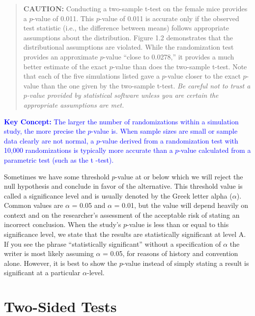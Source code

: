 \documentclass[
]{report}
\begin{document}
\begin{quote}
\textbf{CAUTION:}
Conducting a two-sample t-test on the female mice provides a \(p\)-value of 0.011. This \(p\)-value of 0.011 is accurate only if the observed test statistic (i.e., the difference between means) follows appropriate assumptions about the distribution. Figure 1.2 demonstrates that the distributional assumptions are violated. While the randomization test provides an approximate \(p\)-value ``close to 0.0278,'' it provides a much better estimate of the exact \(p\)-value than does the two-sample t-test. Note that each of the five simulations listed gave a \(p\)-value closer to the exact \(p\)-value than the one given by the two-sample t-test. \textit{Be careful not to trust a $p$-value provided by statistical software unless you are certain the appropriate assumptions are met.}
\end{quote}

\textbf{\textcolor{blue}{Key Concept:}}
\textcolor{blue}{The larger the number of randomizations within a simulation study, the more precise the $p$-value is. When sample sizes are small or sample data clearly are not normal, a $p$-value derived from a randomization test with 10,000 randomizations is typically more accurate than a $p$-value calculated from a parametric test (such as the t -test).}

Sometimes we have some threshold \(p\)-value at or below which we will reject the null hypothesis and conclude in favor of the alternative. This threshold value is called a significance level and is usually denoted by the Greek letter alpha (\(\alpha\)). Common values are \(\alpha\) = 0.05 and \(\alpha\) = 0.01, but the value will depend heavily
on context and on the researcher's assessment of the acceptable risk of stating an incorrect conclusion. When the study's \(p\)-value is less than or equal to this significance level, we state that the results are statistically significant at level A. If you see the phrase ``statistically significant'' without a specification of \(\alpha\) the writer is most likely assuming \(\alpha\) = 0.05, for reasons of history and convention alone. However, it is best to show the \(p\)-value instead of simply stating a result is significant at a particular \(\alpha\)-level.

\hypertarget{two-sided-tests}{%
\section{\texorpdfstring{\textbf{Two-Sided Tests}}{Two-Sided Tests}}\label{two-sided-tests}}
\end{document}
